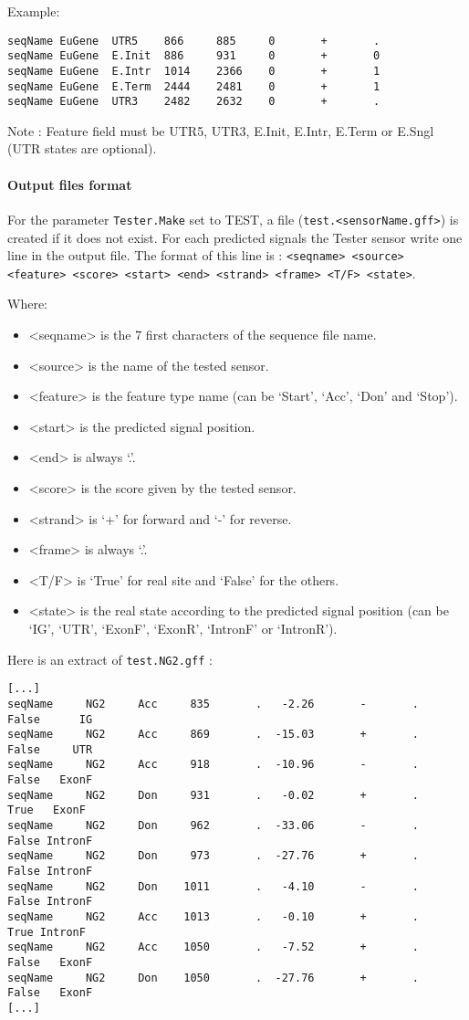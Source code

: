 Example:
\begin{Verbatim}[fontsize=\small]
seqName EuGene  UTR5    866     885     0       +       .
seqName EuGene  E.Init  886     931     0       +       0
seqName EuGene  E.Intr  1014    2366    0       +       1
seqName EuGene  E.Term  2444    2481    0       +       1
seqName EuGene  UTR3    2482    2632    0       +       .
\end{Verbatim}
Note : Feature field must be UTR5, UTR3, E.Init, E.Intr, E.Term or E.Sngl (UTR states are optional).

\paragraph{Output files format}

For the parameter \texttt{Tester.Make} set to TEST, a file
(\texttt{test.<sensorName.gff>}) is created if it does not exist.  For each
predicted signals the Tester sensor write one line in the output file.
The format of this line is : \texttt{<seqname> <source> <feature>
  <score>
  <start> <end> <strand> <frame> <T/F> <state>}.

Where:
\begin{itemize}
\item <seqname> is the 7 first characters of the sequence file name.
\item <source> is the name of the tested sensor.
\item <feature> is the feature type name (can be `Start', `Acc', `Don' and
`Stop').
\item <start> is the predicted signal position.
\item <end> is always `.'.
\item <score> is the score given by the tested sensor.
\item <strand> is `+' for forward and `-' for reverse.
\item <frame> is always `.'.
\item <T/F> is `True' for real site and `False' for the others.
\item <state> is the real state according to the predicted signal
  position (can
  be `IG', `UTR', `ExonF', `ExonR', `IntronF' or `IntronR').
\end{itemize}
Here is an extract of \texttt{test.NG2.gff} :
\begin{Verbatim}[fontsize=\small]
[...]
seqName     NG2     Acc     835       .   -2.26       -       .   False      IG
seqName     NG2     Acc     869       .  -15.03       +       .   False     UTR
seqName     NG2     Acc     918       .  -10.96       -       .   False   ExonF
seqName     NG2     Don     931       .   -0.02       +       .    True   ExonF
seqName     NG2     Don     962       .  -33.06       -       .   False IntronF
seqName     NG2     Don     973       .  -27.76       +       .   False IntronF
seqName     NG2     Don    1011       .   -4.10       -       .   False IntronF
seqName     NG2     Acc    1013       .   -0.10       +       .    True IntronF
seqName     NG2     Acc    1050       .   -7.52       +       .   False   ExonF
seqName     NG2     Don    1050       .  -27.76       +       .   False   ExonF
[...]
\end{Verbatim}

